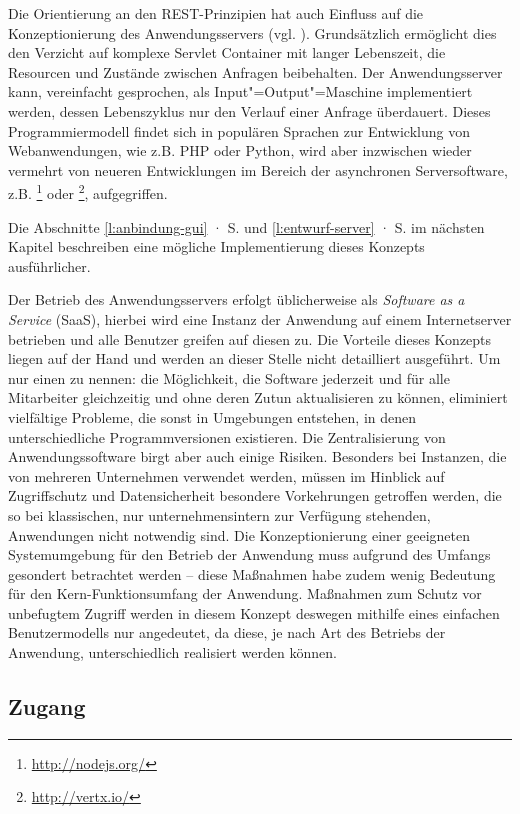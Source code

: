 Die Orientierung an den REST-Prinzipien hat auch Einfluss auf die Konzeptionierung des Anwendungsservers (vgl. \cite[S.127]{rest}). Grundsätzlich ermöglicht dies den Verzicht auf komplexe Servlet Container mit langer Lebenszeit, die Resourcen und Zustände zwischen Anfragen beibehalten. Der Anwendungsserver kann, vereinfacht gesprochen, als Input"=Output"=Maschine implementiert werden, dessen Lebenszyklus nur den Verlauf einer Anfrage überdauert. Dieses Programmiermodell findet sich in populären Sprachen zur Entwicklung von Webanwendungen, wie z.B. PHP oder Python, wird aber inzwischen wieder vermehrt von neueren Entwicklungen im Bereich der asynchronen Serversoftware, z.B. \footnote{\url{http://nodejs.org/}} oder \footnote{\url{http://vertx.io/}}, aufgegriffen.

Die Abschnitte \ref{l:anbindung-gui} · S.\pageref{l:anbindung-gui} und \ref{l:entwurf-server} · S.\pageref{l:entwurf-server} im nächsten Kapitel beschreiben eine mögliche Implementierung dieses Konzepts ausführlicher.

Der Betrieb des Anwendungsservers erfolgt üblicherweise als \emph{Software as a Service} (SaaS), hierbei wird eine Instanz der Anwendung auf einem Internetserver betrieben und alle Benutzer greifen auf diesen zu. Die Vorteile dieses Konzepts liegen auf der Hand und werden an dieser Stelle nicht detailliert ausgeführt. Um nur einen zu nennen: die Möglichkeit, die Software jederzeit und für alle Mitarbeiter gleichzeitig und ohne deren Zutun aktualisieren zu können, eliminiert vielfältige Probleme, die sonst in Umgebungen entstehen, in denen unterschiedliche Programmversionen existieren. Die Zentralisierung von Anwendungssoftware birgt aber auch einige Risiken. Besonders bei Instanzen, die von mehreren Unternehmen verwendet werden, müssen im Hinblick auf Zugriffschutz und Datensicherheit besondere Vorkehrungen getroffen werden, die so bei klassischen, nur unternehmensintern zur Verfügung stehenden, Anwendungen nicht notwendig sind. Die Konzeptionierung einer geeigneten Systemumgebung für den Betrieb der Anwendung muss aufgrund des Umfangs gesondert betrachtet werden -- diese Maßnahmen habe zudem wenig Bedeutung für den Kern-Funktionsumfang der Anwendung. Maßnahmen zum Schutz vor unbefugtem Zugriff werden in diesem Konzept deswegen mithilfe eines einfachen Benutzermodells nur angedeutet, da diese, je nach Art des Betriebs der Anwendung, unterschiedlich realisiert werden können.

\pagebreak

\subsection{Zugang}

